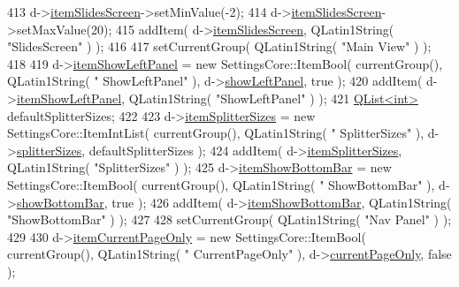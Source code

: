 \begin{DoxyCode}
413   d->\hyperlink{classOkular_1_1SettingsPrivate_af4950dce8d281ec9e8531fed303d3851}{itemSlidesScreen}->setMinValue(-2);
414   d->\hyperlink{classOkular_1_1SettingsPrivate_af4950dce8d281ec9e8531fed303d3851}{itemSlidesScreen}->setMaxValue(20);
415   addItem( d->\hyperlink{classOkular_1_1SettingsPrivate_af4950dce8d281ec9e8531fed303d3851}{itemSlidesScreen}, QLatin1String( \textcolor{stringliteral}{"SlidesScreen"} ) );
416 
417   setCurrentGroup( QLatin1String( \textcolor{stringliteral}{"Main View"} ) );
418 
419   d->\hyperlink{classOkular_1_1SettingsPrivate_ae2114c36e09aec98410ed23e0269ff98}{itemShowLeftPanel} = \textcolor{keyword}{new} SettingsCore::ItemBool( currentGroup(), QLatin1String( \textcolor{stringliteral}{"
      ShowLeftPanel"} ), d->\hyperlink{classOkular_1_1SettingsPrivate_afbeeb8fbbad4a37e416e6c716c75ea03}{showLeftPanel}, \textcolor{keyword}{true} );
420   addItem( d->\hyperlink{classOkular_1_1SettingsPrivate_ae2114c36e09aec98410ed23e0269ff98}{itemShowLeftPanel}, QLatin1String( \textcolor{stringliteral}{"ShowLeftPanel"} ) );
421   \hyperlink{classQList}{QList<int>} defaultSplitterSizes;
422 
423   d->\hyperlink{classOkular_1_1SettingsPrivate_ad5b9f93017723ca704825f3bc5a97088}{itemSplitterSizes} = \textcolor{keyword}{new} SettingsCore::ItemIntList( currentGroup(), QLatin1String( \textcolor{stringliteral}{"
      SplitterSizes"} ), d->\hyperlink{classOkular_1_1SettingsPrivate_aece94cfa10fd07eaa728409e50320fb7}{splitterSizes}, defaultSplitterSizes );
424   addItem( d->\hyperlink{classOkular_1_1SettingsPrivate_ad5b9f93017723ca704825f3bc5a97088}{itemSplitterSizes}, QLatin1String( \textcolor{stringliteral}{"SplitterSizes"} ) );
425   d->\hyperlink{classOkular_1_1SettingsPrivate_a0808b4fe0b5d77a1a1b1df04b8883aae}{itemShowBottomBar} = \textcolor{keyword}{new} SettingsCore::ItemBool( currentGroup(), QLatin1String( \textcolor{stringliteral}{"
      ShowBottomBar"} ), d->\hyperlink{classOkular_1_1SettingsPrivate_a9aa0a34dc52345d31430cb93ebb23b73}{showBottomBar}, \textcolor{keyword}{true} );
426   addItem( d->\hyperlink{classOkular_1_1SettingsPrivate_a0808b4fe0b5d77a1a1b1df04b8883aae}{itemShowBottomBar}, QLatin1String( \textcolor{stringliteral}{"ShowBottomBar"} ) );
427 
428   setCurrentGroup( QLatin1String( \textcolor{stringliteral}{"Nav Panel"} ) );
429 
430   d->\hyperlink{classOkular_1_1SettingsPrivate_ad0d5cbc1d3c00e0f1008fa7cf5248f5b}{itemCurrentPageOnly} = \textcolor{keyword}{new} SettingsCore::ItemBool( currentGroup(), QLatin1String( \textcolor{stringliteral}{"
      CurrentPageOnly"} ), d->\hyperlink{classOkular_1_1SettingsPrivate_af179ccdc3a2baac363aafae958493a8d}{currentPageOnly}, \textcolor{keyword}{false} );

\end{DoxyCode}
